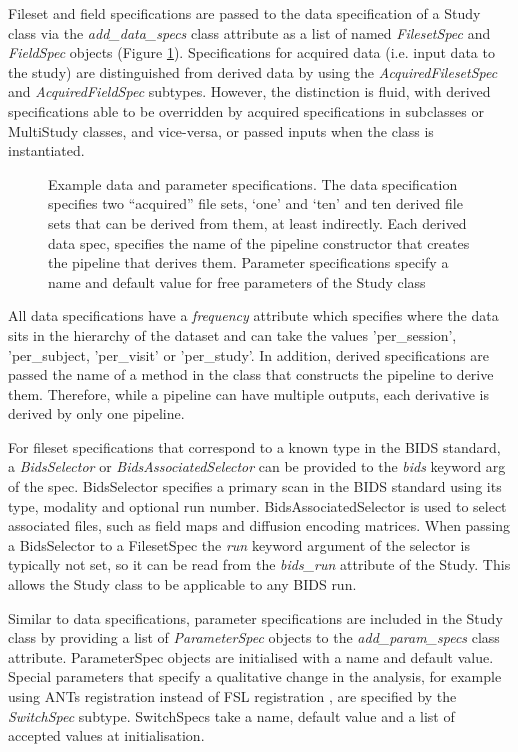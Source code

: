 \documentclass[smallextended]{svjour3}       %
\begin{document}
Fileset and field specifications are passed to the data specification of
a Study class via the \emph{add\_data\_specs} class attribute as a list
of named \emph{FilesetSpec} and \emph{FieldSpec} objects (Figure \ref{fig:data_spec}).
Specifications for acquired data (i.e. input data to the study) are
distinguished from derived data by using the \emph{AcquiredFilesetSpec}
and \emph{AcquiredFieldSpec} subtypes. However, the distinction is
fluid, with derived specifications able to be overridden by acquired
specifications in subclasses or MultiStudy classes, and vice-versa, or
passed inputs when the class is instantiated.

\begin{figure}

\caption{Example data and parameter specifications. The data
specification specifies two ``acquired'' file sets, `one' and `ten' and
ten derived file sets that can be derived from them, at least
indirectly. Each derived data spec, specifies the name of the pipeline
constructor that creates the pipeline that derives them. Parameter
specifications specify a name and default value for free parameters of
the Study class}
\label{fig:data_spec}
\end{figure}

All data specifications have a \emph{frequency} attribute which specifies
where the data sits in the hierarchy of the
dataset and can take the values 'per\_session',
'per\_subject, 'per\_visit' or 'per\_study'. In
addition, derived specifications are passed the name of a method in the
class that constructs the pipeline to derive them. Therefore, while a
pipeline can have multiple outputs, each derivative is derived by only
one pipeline.

For fileset specifications that correspond to a known type in the BIDS
standard, a \emph{BidsSelector} or \emph{BidsAssociatedSelector} can be
provided to the \emph{bids} keyword arg of the spec. BidsSelector
specifies a primary scan in the BIDS standard using its type, modality
and optional run number. BidsAssociatedSelector is used to select
associated files, such as field maps and diffusion encoding matrices.
When passing a BidsSelector to a FilesetSpec the \emph{run} keyword
argument of the selector is typically not set, so it can be read from
the \emph{bids\_run} attribute of the Study. This allows the Study class
to be applicable to any BIDS run.

Similar to data specifications, parameter specifications are included in
the Study class by providing a list of \emph{ParameterSpec} objects to
the \emph{add\_param\_specs} class attribute. ParameterSpec objects
are initialised with a name and default value. Special parameters that
specify a qualitative change in the analysis, for example using ANTs
registration \citep{avants_reproducible_2011} instead of FSL registration
\citep{smith_advances_2004}, are specified by the \emph{SwitchSpec} subtype.
SwitchSpecs take a name, default value and a list of accepted values at
initialisation.
\end{document}
